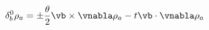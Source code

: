 \begin{equation}
\delta^{0}_{b}\rho_{a}=\pm
\frac{\theta}{2}\vb\times\vnabla\rho_{a}
-t\vb\cdot\vnabla\rho_{a}
\label{ordlrdenschange}
\end{equation}


